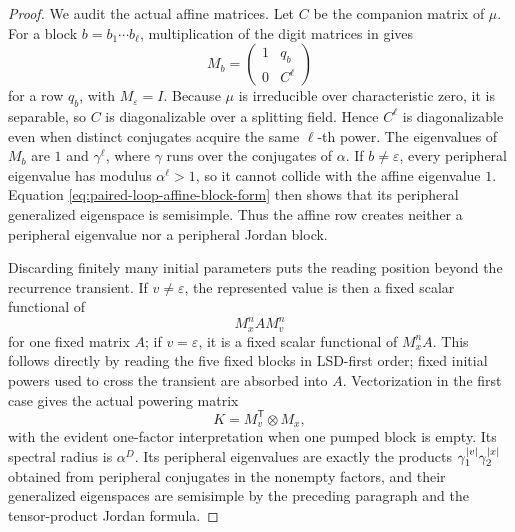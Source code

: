 \begin{proof}
  We audit the actual affine matrices. Let \(C\) be the companion matrix of
  \(\mu\). For a block \(b=b_1\cdots b_\ell\), multiplication of the digit
  matrices in  gives
  \begin{equation}
    M_b=
    \begin{pmatrix}1&q_b\\0&C^\ell\end{pmatrix}
    \label{eq:paired-loop-affine-block-form}
  \end{equation}
  for a row \(q_b\), with \(M_\varepsilon=I\). Because \(\mu\) is
  irreducible over characteristic zero, it is separable, so \(C\) is
  diagonalizable over a splitting field. Hence \(C^\ell\) is
  diagonalizable even when distinct conjugates acquire the same
  \(\ell\)-th power. The eigenvalues of \(M_b\) are \(1\) and
  \(\gamma^\ell\), where \(\gamma\) runs over the conjugates of \(\alpha\).
  If \(b\ne\varepsilon\), every peripheral eigenvalue has modulus
  \(\alpha^\ell>1\), so it cannot collide with the affine eigenvalue \(1\).
  Equation \eqref{eq:paired-loop-affine-block-form} then shows that its
  peripheral generalized eigenspace is semisimple. Thus the affine row
  creates neither a peripheral eigenvalue nor a peripheral Jordan block.

  Discarding finitely many initial parameters puts the reading position
  beyond the recurrence transient. If \(v\ne\varepsilon\), the represented
  value is then a fixed scalar functional of
  \[
    M_x^n A M_v^n
  \]
  for one fixed matrix \(A\); if \(v=\varepsilon\), it is a fixed scalar
  functional of \(M_x^n A\). This follows directly by reading the five
  fixed blocks in LSD-first order; fixed initial powers used to cross the
  transient are absorbed into \(A\). Vectorization in the first case gives
  the actual powering matrix
  \[
    K=M_v^{\mathsf T}\otimes M_x,
  \]
  with the evident one-factor interpretation when one pumped block is
  empty. Its spectral radius is \(\alpha^D\). Its peripheral eigenvalues
  are exactly the products
  \(
    \gamma_1^{\lvert v \rvert}\gamma_2^{\lvert x \rvert}
  \)
  obtained from peripheral conjugates in the nonempty factors, and their
  generalized eigenspaces are semisimple by the preceding paragraph and
  the tensor-product Jordan formula.


\end{proof}
